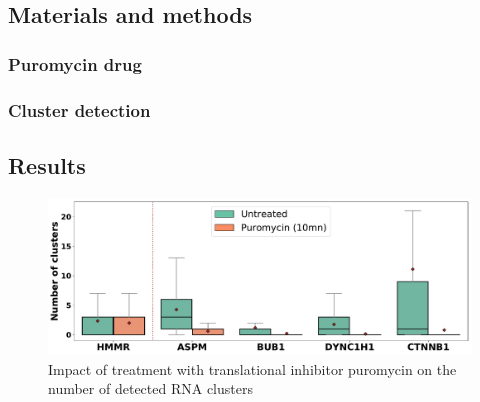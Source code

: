 \subsection{Materials and methods}
\label{subsec:materials_translation_factories}



\subsubsection{Puromycin drug}

\subsubsection{Cluster detection}


\subsection{Results}
\label{subsec:results_translation_factories}

\begin{figure}[h]
    \centering
    \includegraphics[width=\textwidth]{figures/chapter5/plot_puromycin}
    \caption{Impact of treatment with translational inhibitor puromycin on the number of detected RNA clusters}
    \label{fig:plot_puromycin}
\end{figure}

